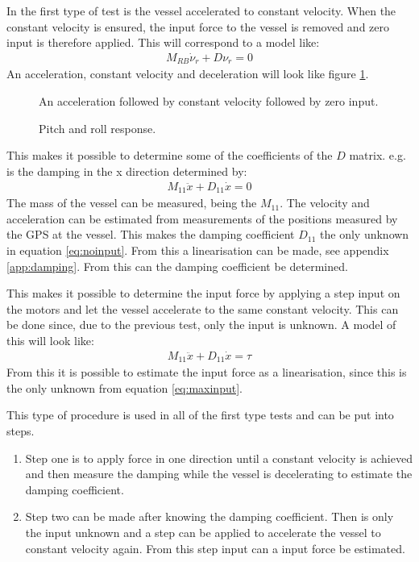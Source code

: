 In the first type of test is the vessel accelerated to constant velocity. When the constant velocity is ensured, the input force to the vessel is removed and zero input is therefore applied. This will correspond to a model like:
\begin{align}
M_{RB} \dot \nu_r + D\nu_r = 0
\label{eq:decelmodel}
\end{align}
An acceleration, constant velocity and deceleration will look like figure \ref{fig:acceldecel}.
\begin{figure}[htbp]
	\centering
	
	\caption{An acceleration followed by constant velocity followed by zero input.}
	\label{fig:acceldecel}
\end{figure}
\begin{figure}[htbp]
	\centering
	
	\caption{Pitch and roll response.}
	\label{fig:harmonic-damping}
\end{figure}
This makes it possible to determine some of the coefficients of the $D$ matrix. e.g. is the damping in the x direction determined by:
\begin{align} 
M_{11} \ddot x + D_{11} \dot x = 0
\label{eq:noinput}
\end{align}
The mass of the vessel can be measured, being the $M_{11}$. The velocity and acceleration can be estimated from measurements of the positions measured by the \ac{GPS} at the vessel. This makes the damping coefficient $D_{11}$ the only unknown in equation \ref{eq:noinput}. From this a linearisation can be made, see appendix \ref{app:damping}. From this can the damping coefficient be determined.

This makes it possible to determine the input force by applying a step input on the motors and let the vessel accelerate to the same constant velocity. This can be done since, due to the previous test, only the input is unknown. A model of this will look like:
\begin{align} 
M_{11} \ddot x + D_{11} \dot x = \tau
\label{eq:maxinput}
\end{align}
From this it is possible to estimate the input force as a linearisation, since this is the only unknown from equation \ref{eq:maxinput}.

This type of procedure is used in all of the first type tests and can be put into steps.
\begin{enumerate}
	\item Step one is to apply force in one direction until a constant velocity is achieved and then measure the damping while the vessel is decelerating to estimate the damping coefficient.
	\item Step two can be made after knowing the damping coefficient. Then is only the input unknown and a step can be applied to accelerate the vessel to constant velocity again. From this step input can a input force be estimated.
\end{enumerate}

